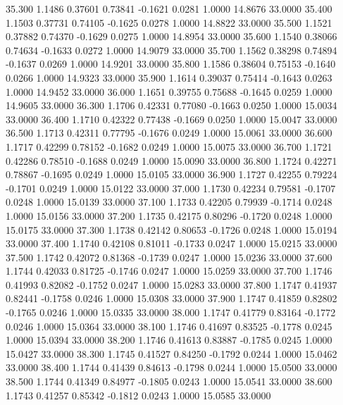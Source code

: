  35.300   1.1486   0.37601   0.73841  -0.1621   0.0281   1.0000  14.8676  33.0000
  35.400   1.1503   0.37731   0.74105  -0.1625   0.0278   1.0000  14.8822  33.0000
  35.500   1.1521   0.37882   0.74370  -0.1629   0.0275   1.0000  14.8954  33.0000
  35.600   1.1540   0.38066   0.74634  -0.1633   0.0272   1.0000  14.9079  33.0000
  35.700   1.1562   0.38298   0.74894  -0.1637   0.0269   1.0000  14.9201  33.0000
  35.800   1.1586   0.38604   0.75153  -0.1640   0.0266   1.0000  14.9323  33.0000
  35.900   1.1614   0.39037   0.75414  -0.1643   0.0263   1.0000  14.9452  33.0000
  36.000   1.1651   0.39755   0.75688  -0.1645   0.0259   1.0000  14.9605  33.0000
  36.300   1.1706   0.42331   0.77080  -0.1663   0.0250   1.0000  15.0034  33.0000
  36.400   1.1710   0.42322   0.77438  -0.1669   0.0250   1.0000  15.0047  33.0000
  36.500   1.1713   0.42311   0.77795  -0.1676   0.0249   1.0000  15.0061  33.0000
  36.600   1.1717   0.42299   0.78152  -0.1682   0.0249   1.0000  15.0075  33.0000
  36.700   1.1721   0.42286   0.78510  -0.1688   0.0249   1.0000  15.0090  33.0000
  36.800   1.1724   0.42271   0.78867  -0.1695   0.0249   1.0000  15.0105  33.0000
  36.900   1.1727   0.42255   0.79224  -0.1701   0.0249   1.0000  15.0122  33.0000
  37.000   1.1730   0.42234   0.79581  -0.1707   0.0248   1.0000  15.0139  33.0000
  37.100   1.1733   0.42205   0.79939  -0.1714   0.0248   1.0000  15.0156  33.0000
  37.200   1.1735   0.42175   0.80296  -0.1720   0.0248   1.0000  15.0175  33.0000
  37.300   1.1738   0.42142   0.80653  -0.1726   0.0248   1.0000  15.0194  33.0000
  37.400   1.1740   0.42108   0.81011  -0.1733   0.0247   1.0000  15.0215  33.0000
  37.500   1.1742   0.42072   0.81368  -0.1739   0.0247   1.0000  15.0236  33.0000
  37.600   1.1744   0.42033   0.81725  -0.1746   0.0247   1.0000  15.0259  33.0000
  37.700   1.1746   0.41993   0.82082  -0.1752   0.0247   1.0000  15.0283  33.0000
  37.800   1.1747   0.41937   0.82441  -0.1758   0.0246   1.0000  15.0308  33.0000
  37.900   1.1747   0.41859   0.82802  -0.1765   0.0246   1.0000  15.0335  33.0000
  38.000   1.1747   0.41779   0.83164  -0.1772   0.0246   1.0000  15.0364  33.0000
  38.100   1.1746   0.41697   0.83525  -0.1778   0.0245   1.0000  15.0394  33.0000
  38.200   1.1746   0.41613   0.83887  -0.1785   0.0245   1.0000  15.0427  33.0000
  38.300   1.1745   0.41527   0.84250  -0.1792   0.0244   1.0000  15.0462  33.0000
  38.400   1.1744   0.41439   0.84613  -0.1798   0.0244   1.0000  15.0500  33.0000
  38.500   1.1744   0.41349   0.84977  -0.1805   0.0243   1.0000  15.0541  33.0000
  38.600   1.1743   0.41257   0.85342  -0.1812   0.0243   1.0000  15.0585  33.0000
